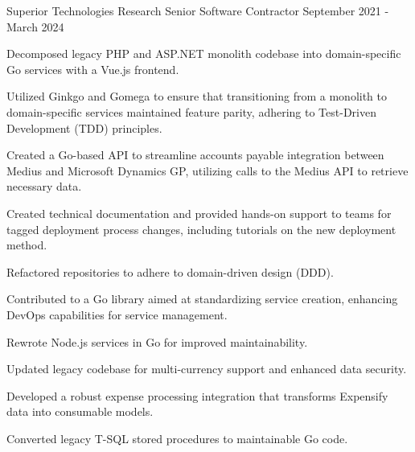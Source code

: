 \documentclass{../styles/cv}
\begin{document}
\subsectionpositiondate
    {Superior Technologies Research}
    {Senior Software Contractor}
    {September 2021 - March 2024}
\resumesublistbegin
    \item Decomposed legacy PHP and ASP.NET monolith codebase into domain-specific Go services with a Vue.js frontend.
    \item Utilized Ginkgo and Gomega to ensure that transitioning from a monolith to domain-specific services maintained feature parity, adhering to Test-Driven Development (TDD) principles.
    \item Created a Go-based API to streamline accounts payable integration between Medius and Microsoft Dynamics GP, utilizing calls to the Medius API to retrieve necessary data.
    \item Created technical documentation and provided hands-on support to teams for tagged deployment process changes, including tutorials on the new deployment method.
    \item Refactored repositories to adhere to domain-driven design (DDD).
    \item Contributed to a Go library aimed at standardizing service creation, enhancing DevOps capabilities for service management.
    \item Rewrote Node.js services in Go for improved maintainability.
    \item Updated legacy codebase for multi-currency support and enhanced data security.
    \item Developed a robust expense processing integration that transforms Expensify data into consumable models.
    \item Converted legacy T-SQL stored procedures to maintainable Go code.
\resumesublistend
\end{document}
